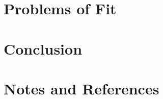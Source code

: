 \documentclass{article}
\begin{document}
\section{Problems of Fit}

\section{Conclusion}

\section{Notes and References}
    
\end{document}
